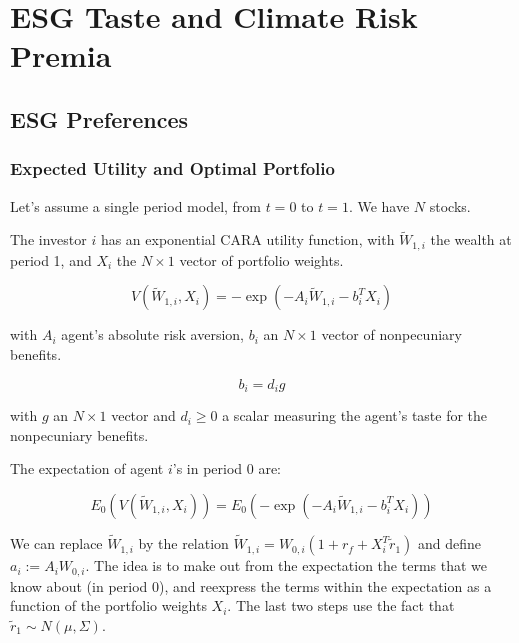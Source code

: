 \chapter{ESG Taste and Climate Risk Premia}

\section{ESG Preferences}


\subsection{Expected Utility and Optimal Portfolio}

Let's assume a single period model, from $t=0$ to $t=1$.
We have $N$ stocks. 

The investor $i$ has an exponential CARA utility function, with 
$\tilde{W}_{1,i}$ the wealth at period 1, and $X_i$ the
$N \times 1$ vector of portfolio weights.

\begin{equation}
    V(\tilde{W}_{1,i}, X_i) = -\exp{(-A_i \tilde{W}_{1,i}-b_i^T X_i)}
\end{equation}

with $A_i$ agent's absolute risk aversion, $b_i$ an $N \times 1$ vector of nonpecuniary 
benefits. 

\begin{equation}
    b_i = d_i g 
\end{equation}

with $g$ an $N \times 1$ vector and $d_i \geq 0$ a scalar measuring 
the agent's taste for the nonpecuniary benefits.


The expectation of agent $i$'s in period 0 are:

\begin{equation}
    E_0(V(\tilde{W}_{1,i}, X_i)) = E_0(-\exp{(-A_i \tilde{W}_{1,i}-b_i^T X_i)})
\end{equation}

We can replace $\tilde{W}_{1,i}$ by the relation 
$\tilde{W}_{1,i} = W_{0,i}(1 + r_f + X_i^T \tilde{r}_1)$
 and define $a_i := A_i W_{0,i}$. The idea is to make out from the
expectation the terms that we know about (in period 0), and reexpress 
the terms within the expectation as a function of the
portfolio weights $X_i$. The last two steps use the fact that 
$\tilde{r}_1 \sim N(\mu, \Sigma)$.

